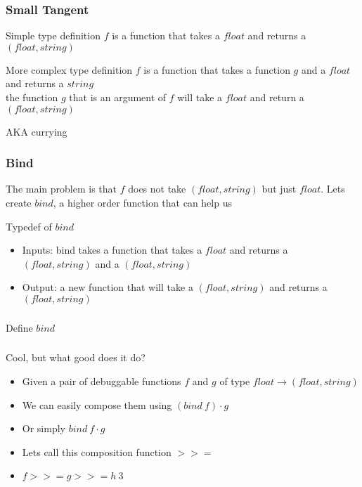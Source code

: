 \begin{frame}[fragile]
    \frametitle{Small Tangent}
    \begin{block}{Simple type definition}
        $f$ is a function that takes a $float$ and returns a $(float, string)$
        
    \end{block}
    \begin{block}{More complex type definition}
        $f$ is a function that takes a function $g$ and a $float$ and returns a $string$ \\
        the function $g$ that is an argument of $f$ will take a $float$ and return a $(float, string)$
        
        AKA currying
    \end{block}
\end{frame}

\begin{frame}[fragile]
    \frametitle{Bind}
    \begin{block}{}
        The main problem is that $f$ does not take $(float, string)$ but just $float$. Lets create $bind$, a higher
        order function that can help us
    \end{block}
    \begin{block}{Typedef of $bind$}
        \begin{itemize}
            \item Inputs: bind takes a function that takes a $float$ and returns a $(float,string)$ and a $(float, string)$
            \item Output: a new function that will take a $(float, string)$ and returns a $(float, string)$
        \end{itemize}
        
    \end{block}
\end{frame}

\begin{frame}[fragile]
    \frametitle{}
    \begin{block}{Define $bind$}
        
    \end{block}
\end{frame}

\begin{frame}[fragile]
    \frametitle{}
    \begin{block}{Cool, but what good does it do?}
        \begin{itemize}
            \item Given a pair of debuggable functions $f$ and $g$ of type $float \rightarrow (float, string)$
            \item We can easily compose them using $(bind \: f) \cdot g$
            \item Or simply $bind \: f \cdot g$
            \item Lets call this composition function $>>=$
            \item $f >>= g >>= h \: 3$
        \end{itemize}
    \end{block}
\end{frame}

